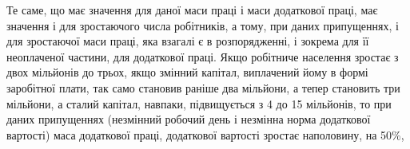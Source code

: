 Те саме, що має значення для даної маси праці і маси додаткової
праці, має значення і для зростаючого числа робітників, а тому, при
даних припущеннях, і для зростаючої маси праці, яка взагалі
є в розпорядженні, і зокрема для її неоплаченої частини, для
додаткової праці. Якщо робітниче населення зростає з двох мільйонів
до трьох, якщо змінний капітал, виплачений йому в формі
заробітної плати, так само становив раніше два мільйони, а тепер
становить три мільйони, а сталий капітал, навпаки, підвищується
з 4 до 15 мільйонів, то при даних припущеннях (незмінний
робочий день і незмінна норма додаткової вартості) маса додаткової
праці, додаткової вартості зростає наполовину, на 50\%,
\parbreak{}  %
